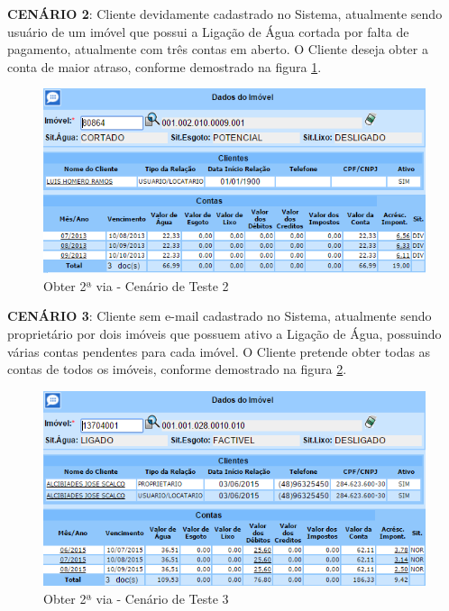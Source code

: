 \begin{flushleft}
	\begin{description}
		\item \textbf{CENÁRIO 2}: Cliente devidamente cadastrado no Sistema, atualmente sendo usuário de um imóvel que possui a Ligação de Água cortada por falta de pagamento, atualmente com três contas em aberto. O Cliente deseja obter a conta de maior atraso, conforme demostrado na figura \ref{figura:2ViaCenario2}.
		\begin{figure}[H]
			\centering
			\caption{Obter 2ª via - Cenário de Teste 2}
			\label{figura:2ViaCenario2}
			\includegraphics{figuras/cenarios/segunda_via/cenario_2.PNG}
		\end{figure}
	\end{description}
	
	\begin{description}
		\item \textbf{CENÁRIO 3}: Cliente sem e-mail cadastrado no Sistema, atualmente sendo proprietário por dois imóveis que possuem ativo a Ligação de Água, possuindo várias contas pendentes para cada imóvel. O Cliente pretende obter todas as contas de todos os imóveis, conforme demostrado na figura \ref{figura:2ViaCenario3}.
		\begin{figure}[H]
			\centering
			\caption{Obter 2ª via - Cenário de Teste 3}
			\label{figura:2ViaCenario3}
			\includegraphics{figuras/cenarios/segunda_via/cenario_3.PNG}
			\legend {\fontsize{10}{12}\selectfont {Fonte: Autoria Própria}.}	
		\end{figure}
	\end{description}
	
\end{flushleft}


